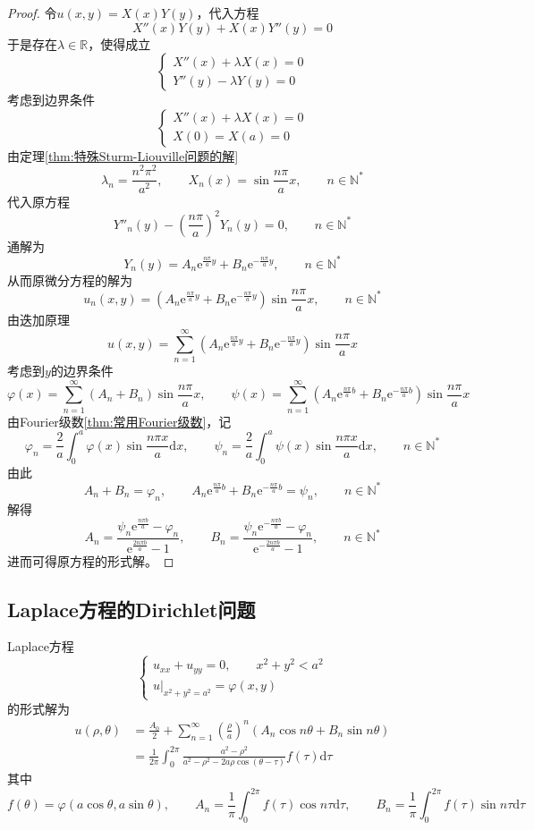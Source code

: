 \documentclass[lang = cn, scheme = chinese, thmcnt = section]{elegantbook}
\newcommand{\N}{\mathbb{N}}            %
\newcommand{\R}{\mathbb{R}}            %
\newcommand{\dd}{\mathrm{d}}           %
\newcommand{\ee}[1]{\mathrm{e}^{#1}}   %
\begin{document}
\begin{proof}
	令$u(x,y)=X(x)Y(y)$，代入方程
	$$
	X''(x)Y(y)+X(x)Y''(y)=0
	$$
	于是存在$\lambda\in\R$，使得成立
	$$
	\begin{cases}
		X''(x)+\lambda X(x)=0\\
		Y''(y)-\lambda Y(y)=0
	\end{cases}
	$$
	考虑到边界条件%
	$$
	\begin{cases}
		X''(x)+\lambda X(x)=0\\
		X(0)=X(a)=0
	\end{cases}
	$$
	由定理\ref{thm:特殊Sturm-Liouville问题的解}%
	$$
	\lambda_n=\frac{n^2\pi^2}{a^2},\qquad 
	X_n(x)=\sin\frac{n\pi}{a}x,\qquad n\in\N^*
	$$
	代入原方程%
	$$
	Y''_n(y)-\left(\frac{n\pi}{a}\right)^2 Y_n(y)=0,\qquad n\in\N^*
	$$
	通解为%
	$$
	Y_n(y)=A_n\ee{\frac{n\pi}{a}y}+B_n\ee{-\frac{n\pi}{a}y},\qquad n\in\N^*
	$$
	从而原微分方程的解为%
	$$
	u_n(x,y)=\left(A_n\ee{\frac{n\pi}{a}y}+B_n\ee{-\frac{n\pi}{a}y}\right)\sin\frac{n\pi}{a}x,\qquad n\in\N^*
	$$
	由迭加原理
	$$
	u(x,y)=\sum_{n=1}^{\infty}\left(A_n\ee{\frac{n\pi}{a}y}+B_n\ee{-\frac{n\pi}{a}y}\right)\sin\frac{n\pi}{a}x
	$$
	考虑到$y$的边界条件%
	$$
	\varphi(x)=\sum_{n=1}^{\infty}(A_n+B_n)\sin\frac{n\pi}{a}x,\qquad 
	\psi(x)=\sum_{n=1}^{\infty}\left(A_n\ee{\frac{n\pi}{a}b}+B_n\ee{-\frac{n\pi}{a}b}\right)\sin\frac{n\pi}{a}x
	$$
	由Fourier级数\ref{thm:常用Fourier级数}，记%
	$$
	\varphi_n=\frac{2}{a}\int_{0}^{a}\varphi(x)\sin\frac{n\pi x}{a}\dd x,\qquad 
	\psi_n=\frac{2}{a}\int_{0}^{a}\psi(x)\sin\frac{n\pi x}{a}\dd x,\qquad 
	n\in\N^*
	$$
	由此%
	$$
	A_n+B_n=\varphi_n,\qquad 
	A_n\ee{\frac{n\pi}{a}b}+B_n\ee{-\frac{n\pi}{a}b}=\psi_n,\qquad 
	n\in\N^*
	$$
	解得%
	$$
	A_n=\frac{\psi_n\ee{\frac{n\pi b}{a}}-\varphi_n}{\ee{\frac{2n\pi b}{a}}-1},\qquad 
	B_n=\frac{\psi_n\ee{-\frac{n\pi b}{a}}-\varphi_n}{\ee{-\frac{2n\pi b}{a}}-1},\qquad 
	n\in\N^*
	$$
	进而可得原方程的形式解。
\end{proof}

\subsection{Laplace方程的Dirichlet问题}

\begin{theorem}
	Laplace方程%
	$$
	\begin{cases}
		u_{xx}+u_{yy}=0,\qquad x^2+y^2<a^2\\
		u|_{x^2+y^2=a^2}=\varphi(x,y)
	\end{cases}
	$$
	的形式解为
	\begin{align*}
		u(\rho,\theta)
		& = \frac{A_0}{2}+\sum_{n=1}^{\infty}\left(\frac{\rho}{a}\right)^n\left(A_n\cos n\theta+B_n\sin n\theta\right)\\
		& = \frac{1}{2\pi}\int_{0}^{2\pi}\frac{a^2-\rho^2}{a^2-\rho^2-2a\rho\cos(\theta-\tau)}f(\tau)\dd \tau
	\end{align*}
	其中
	$$
	f(\theta)=\varphi(a\cos\theta,a\sin\theta),\qquad 
	A_n=\frac{1}{\pi}\int_{0}^{2\pi}f(\tau)\cos n \tau\dd \tau,\qquad 
	B_n=\frac{1}{\pi}\int_{0}^{2\pi}f(\tau)\sin n \tau\dd \tau
	$$
\end{theorem}
\end{document}
